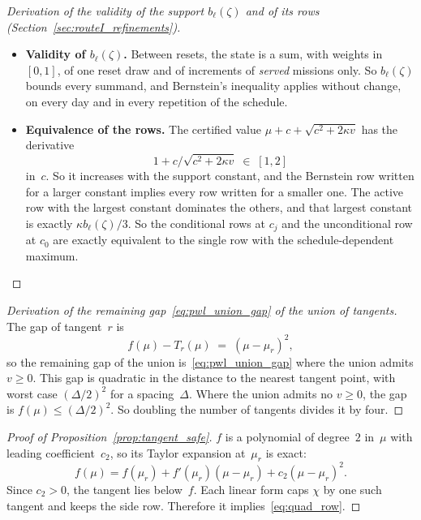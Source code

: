 \documentclass[11pt,a4paper]{article}
\theoremstyle{plain}
\theoremstyle{definition}
\theoremstyle{remark}
\begin{document}
\label{drv:sched_support}
\begin{proof}[Derivation of the validity of the support $b_\ell(\zeta)$ and of its rows (Section~\ref{sec:routeI_refinements})]\leavevmode
\begin{itemize}
  \item \textbf{Validity of $b_\ell(\zeta)$.} Between resets, the state is a sum, with weights in $[0,1]$, of one reset draw and of increments of \emph{served} missions only.
    So $b_\ell(\zeta)$ bounds every summand, and Bernstein's inequality applies without change, on every day and in every repetition of the schedule.
  \item \textbf{Equivalence of the rows.} The certified value $\mu + c + \sqrt{c^2 + 2\kappa v}$ has the derivative
    \begin{equation}
      1 + c/\sqrt{c^2 + 2\kappa v} \;\in\; [1,2]
    \end{equation}
    in~$c$.
    So it increases with the support constant, and the Bernstein row written for a larger constant implies every row written for a smaller one.
    The active row with the largest constant dominates the others, and that largest constant is exactly $\kappa b_\ell(\zeta)/3$.
    So the conditional rows at $c_j$ and the unconditional row at $c_0$ are exactly equivalent to the single row with the schedule-dependent maximum.
\end{itemize}
\end{proof}

\label{drv:pwl_recovery}
\begin{proof}[Derivation of the remaining gap~\eqref{eq:pwl_union_gap} of the union of tangents]
The gap of tangent~$r$ is
\begin{equation}
  f(\mu) - T_r(\mu) \;=\; (\mu - \mu_r)^2,
\end{equation}
so the remaining gap of the union is~\eqref{eq:pwl_union_gap} where the union admits $v \ge 0$.
This gap is quadratic in the distance to the nearest tangent point, with worst case $(\Delta/2)^2$ for a spacing~$\Delta$.
Where the union admits no $v \ge 0$, the gap is $f(\mu) \le (\Delta/2)^2$.
So doubling the number of tangents divides it by four.
\end{proof}

\label{prf:prop:tangent_safe}
\begin{proof}[Proof of Proposition~\ref{prop:tangent_safe}]
$f$ is a polynomial of degree~$2$ in~$\mu$ with leading coefficient~$c_2$, so its Taylor expansion at~$\mu_r$ is exact:
\begin{equation}
  f(\mu) = f(\mu_r) + f'(\mu_r)(\mu - \mu_r) + c_2(\mu - \mu_r)^2.
\end{equation}
Since $c_2 > 0$, the tangent lies below~$f$.
Each linear form caps $\chi$ by one such tangent and keeps the side row.
Therefore it implies~\eqref{eq:quad_row}.
\end{proof}
\end{document}
